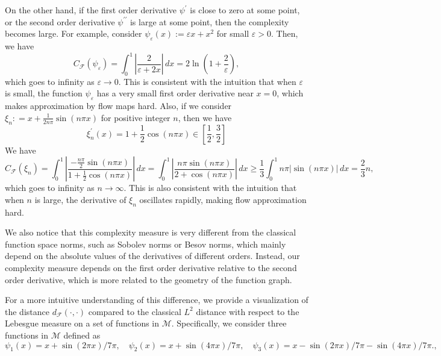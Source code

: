 \documentclass[12pt]{amsart}
\numberwithin{equation}{section}
\theoremstyle{remark}
\begin{document}
On the other hand, if the first order derivative $\psi^\prime$ is close to zero at some point, or the second order derivative $\psi^{\prime\prime}$ is large at some point, then the complexity becomes large. For example, consider $\psi_{\varepsilon}(x):= \varepsilon x+ x^2$ for small $\varepsilon>0$. Then, we have
\begin{equation}
    C_{\mathcal F}(\psi_\varepsilon) = \int_0^1 \left|\frac{2}{\varepsilon + 2x}\right|\, dx = 2\ln\left(1+\frac{2}{\varepsilon}\right),
\end{equation}
which goes to infinity as $\varepsilon\to 0$. This is consistent with the intuition that when $\varepsilon$ is small, the function $\psi_\varepsilon$ has a very small first order derivative near $x=0$, which makes approximation by flow maps hard.
Also, if we consider $\xi_n: = x+\frac{1}{2n\pi}\sin(n\pi x)$ for positive integer $n$, then we have
\begin{equation}
    \xi_n^\prime(x) = 1+\frac{1}{2}\cos(n\pi x)\in [\frac{1}{2}, \frac{3}{2}]
\end{equation}
We have
\begin{equation}
    C_{\mathcal F}(\xi_n) = \int_0^1 \left|\frac{-\frac{n\pi}{2}\sin(n\pi x)}{1+\frac{1}{2}\cos(n\pi x)}\right|\, dx = \int_0^1 \left|\frac{n\pi \sin(n\pi x)}{2+\cos(n\pi x)}\right|\, dx\ge \frac{1}{3} \int_0^1 n\pi |\sin(n\pi x)|\, dx = \frac{2}{3} n,
\end{equation}
which goes to infinity as $n\to \infty$. This is also consistent with the intuition that when $n$ is large, the derivative of $\xi_n$ oscillates rapidly, making flow approximation hard.

We also notice that this complexity measure is very different from the classical function space norms,
such as Sobolev norms or Besov norms, which mainly depend on the absolute values of the derivatives of different orders.
Instead, our complexity measure depends on the first order derivative relative to the second order derivative,
which is more related to the geometry of the function graph.

For a more intuitive understanding of this difference,
we provide a visualization of the distance $d_{\mathcal F}(\cdot, \cdot)$
compared to the classical $L^2$ distance with respect to the Lebesgue measure
on a set of functions in $\mathcal M$. Specifically, we consider three functions in $\mathcal M$ defined as
\begin{equation}
    \psi_1(x) = x+\sin (2\pi x)/7\pi, \quad \psi_2(x) = x+\sin (4\pi x)/7\pi, \quad \psi_3(x) = x-\sin (2\pi x)/7\pi - \sin(4\pi x)/7\pi.,
\end{equation}
\end{document}
